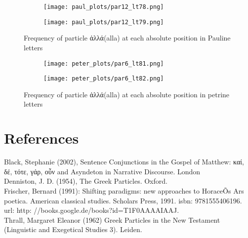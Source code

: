 \documentclass[a4paper]{article}
\begin{document}
\begin{figure}
\ContinuedFloat
\begin{subfigure}{0.45\textwidth}
\centering
\texttt{[image: paul\_plots/par12\_lt78.png]}
\end{subfigure}
\begin{subfigure}{0.45\textwidth}
\centering
\texttt{[image: paul\_plots/par12\_lt79.png]}
\end{subfigure}
\caption{Frequency of particle \textgreek{ἀλλά}(alla) at each absolute position in Pauline letters}
\end{figure}

\begin{figure}
\begin{subfigure}{0.45\textwidth}
\centering
\texttt{[image: peter\_plots/par6\_lt81.png]}
\end{subfigure}
\begin{subfigure}{0.45\textwidth}
\centering
\texttt{[image: peter\_plots/par6\_lt82.png]}
\end{subfigure}
\caption{Frequency of particle \textgreek{ἀλλά}(alla) at each absolute position in petrine letters}
\label{peter_akka}
\end{figure}


\section{References}
Black, Stephanie (2002), Sentence Conjunctions in the Gospel of Matthew: \textgreek{καί, δέ, τότε, γάρ, οὖν} and Asyndeton in Narrative Discourse. London \\

Denniston, J. D. (1954), The Greek Particles. Oxford. \\

Frischer, Bernard (1991): Shifting paradigms: new approaches to HoraceÕs Ars poetica. American classical studies. Scholars Press, 1991. isbn: 9781555406196. url: http: //books.google.de/books?id=T1F0AAAAIAAJ. \\ 

Thrall, Margaret Eleanor (1962) Greek Particles in the New Testament (Linguistic and Exegetical Studies 3). Leiden. \\
\end{document}
